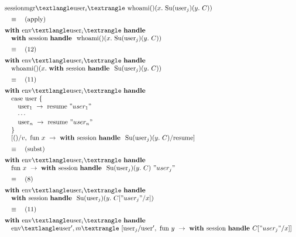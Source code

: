 \documentclass[logo,bsc,singlespacing,parskip]{infthesis}
\begin{document}
\[
\begin{array}{l}
\text{sessionmgr}⟨\text{user}_i⟩\ \text{whoami}()(x.\ \text{Su}(\text{user}_j)(y.\ C)) \\[5pt]

\quad\equiv\quad (\text{apply}) \\[5pt]
\textbf{with } \text{env}⟨\text{user}_i⟩\ \textbf{handle} \\
\quad \textbf{with } \text{session}\ \textbf{handle }\ \text{whoami}()(x.\ \text{Su}(\text{user}_j)(y.\ C)) \\[5pt]

\quad\equiv\quad (12) \\[5pt]
\textbf{with } \text{env}⟨\text{user}_i⟩\ \textbf{handle} \\
\quad \text{whoami}()(x.\ \textbf{with } \text{session}\ \textbf{handle }\ \text{Su}(\text{user}_j)(y.\ C)) \\[5pt]

\quad\equiv\quad (11) \\[5pt]
\textbf{with } \text{env}⟨\text{user}_i⟩\ \textbf{handle} \\
\quad \text{case user \{} \\
\quad\quad \text{user}_1\ \rightarrow\ \text{resume } "user_1" \\
\quad\quad \cdots \\
\quad\quad \text{user}_n\ \rightarrow\ \text{resume } "user_n" \\
\quad\} \\
\quad [()/v,\ \text{fun } x\ \rightarrow\ \textbf{with } \text{session}\ \textbf{handle }\ \text{Su}(\text{user}_j)(y.\ C) / \text{resume}] \\[5pt]

\quad\equiv\quad (\text{subst}) \\[5pt]
\textbf{with } \text{env}⟨\text{user}_i⟩\ \textbf{handle} \\
\quad \text{fun } x\ \rightarrow\ \textbf{with } \text{session}\ \textbf{handle }\ \text{Su}(\text{user}_j)(y.\ C)\ "user_j" \\[5pt]

\quad\equiv\quad (8) \\[5pt]
\textbf{with } \text{env}⟨\text{user}_i⟩\ \textbf{handle} \\
\quad \textbf{with } \text{session}\ \textbf{handle }\ \text{Su}(\text{user}_j)(y.\ C["user_j"/x]) \\[5pt]

\quad\equiv\quad (11) \\[5pt]
\textbf{with } \text{env}⟨\text{user}_i⟩\ \textbf{handle} \\
\quad \text{env}⟨\text{user}', m⟩\ [\text{user}_j/\text{user}',\ \text{fun } y\ \rightarrow\ \textbf{with } \text{session}\ \textbf{handle } C["user_j"/x]] \\[5pt]


\end{array}\]
\end{document}
